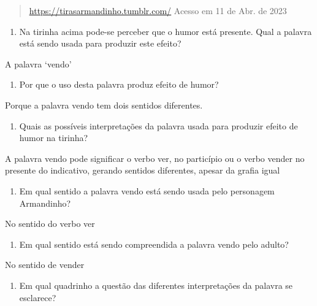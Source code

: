 {\begin{quote}
\href{https://tirasarmandinho.tumblr.com/}{\uline{https://tirasarmandinho.tumblr.com/}}
Acesso em 11 de Abr. de 2023
\end{quote}

\begin{enumerate}
\def\labelenumi{\arabic{enumi})}
\tightlist
\item
  Na tirinha acima pode-se perceber que o humor está presente. Qual a
  palavra está sendo usada para produzir este efeito?
\end{enumerate}

A palavra `vendo'

\begin{enumerate}
\def\labelenumi{\arabic{enumi})}
\setcounter{enumi}{1}
\tightlist
\item
  Por que o uso desta palavra produz efeito de humor?
\end{enumerate}

Porque a palavra vendo tem dois sentidos diferentes.

\begin{enumerate}
\def\labelenumi{\arabic{enumi})}
\setcounter{enumi}{2}
\tightlist
\item
  Quais as possíveis interpretações da palavra usada para produzir
  efeito de humor na tirinha?
\end{enumerate}

A palavra vendo pode significar o verbo ver, no particípio ou o verbo
vender no presente do indicativo, gerando sentidos diferentes, apesar da
grafia igual

\begin{enumerate}
\def\labelenumi{\arabic{enumi})}
\setcounter{enumi}{3}
\tightlist
\item
  Em qual sentido a palavra vendo está sendo usada pelo personagem
  Armandinho?
\end{enumerate}

No sentido do verbo ver

\begin{enumerate}
\def\labelenumi{\arabic{enumi})}
\setcounter{enumi}{4}
\tightlist
\item
  Em qual sentido está sendo compreendida a palavra vendo pelo adulto?
\end{enumerate}

No sentido de vender

\begin{enumerate}
\def\labelenumi{\arabic{enumi})}
\setcounter{enumi}{5}
\tightlist
\item
  Em qual quadrinho a questão das diferentes interpretações da palavra
  se esclarece?
\end{enumerate}

}
